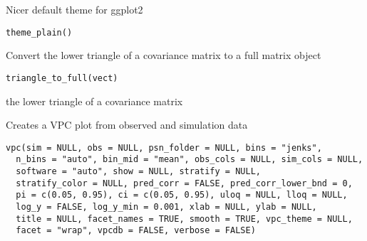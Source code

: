 \documentclass[letterpaper]{book}
\begin{document}
%
\begin{Description}\relax
Nicer default theme for ggplot2
\end{Description}
%
\begin{Usage}
\begin{verbatim}
theme_plain()
\end{verbatim}
\end{Usage}
%
\begin{Description}\relax
Convert the lower triangle of a covariance matrix to a full matrix object
\end{Description}
%
\begin{Usage}
\begin{verbatim}
triangle_to_full(vect)
\end{verbatim}
\end{Usage}
%
\begin{Arguments}
\begin{ldescription}
\item[\code{vect}] the lower triangle of a covariance matrix
\end{ldescription}
\end{Arguments}
%
\begin{Description}\relax
Creates a VPC plot from observed and simulation data
\end{Description}
%
\begin{Usage}
\begin{verbatim}
vpc(sim = NULL, obs = NULL, psn_folder = NULL, bins = "jenks",
  n_bins = "auto", bin_mid = "mean", obs_cols = NULL, sim_cols = NULL,
  software = "auto", show = NULL, stratify = NULL,
  stratify_color = NULL, pred_corr = FALSE, pred_corr_lower_bnd = 0,
  pi = c(0.05, 0.95), ci = c(0.05, 0.95), uloq = NULL, lloq = NULL,
  log_y = FALSE, log_y_min = 0.001, xlab = NULL, ylab = NULL,
  title = NULL, facet_names = TRUE, smooth = TRUE, vpc_theme = NULL,
  facet = "wrap", vpcdb = FALSE, verbose = FALSE)
\end{verbatim}
\end{Usage}
%
\end{document}
